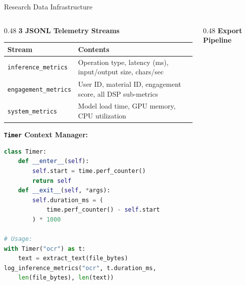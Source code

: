 \documentclass[aspectratio=169,10pt]{beamer}
\begin{document}
\begin{frame}{Research Data Infrastructure}
\begin{columns}[T]
\begin{column}{0.48\textwidth}
\textbf{3 JSONL Telemetry Streams}

\vspace{4pt}
\footnotesize
\begin{tabular}{@{}lp{4.5cm}@{}}
\toprule
\textbf{Stream} & \textbf{Contents} \\
\midrule
\texttt{inference\_metrics} & Operation type, latency (ms), input/output size, chars/sec \\[4pt]
\texttt{engagement\_metrics} & User ID, material ID, engagement score, all DSP sub-metrics \\[4pt]
\texttt{system\_metrics} & Model load time, GPU memory, CPU utilization \\
\bottomrule
\end{tabular}

\vspace{6pt}
\textbf{\texttt{Timer} Context Manager:}
\begin{lstlisting}[language=Python, basicstyle=\ttfamily\tiny]
class Timer:
    def __enter__(self):
        self.start = time.perf_counter()
        return self
    def __exit__(self, *args):
        self.duration_ms = (
            time.perf_counter() - self.start
        ) * 1000

# Usage:
with Timer("ocr") as t:
    text = extract_text(file_bytes)
log_inference_metrics("ocr", t.duration_ms,
    len(file_bytes), len(text))
\end{lstlisting}
\end{column}

\begin{column}{0.48\textwidth}
\textbf{Export Pipeline}

\vspace{4pt}
\begin{center}
\end{center}
\end{column}
\end{columns}
\end{frame}
\end{document}
